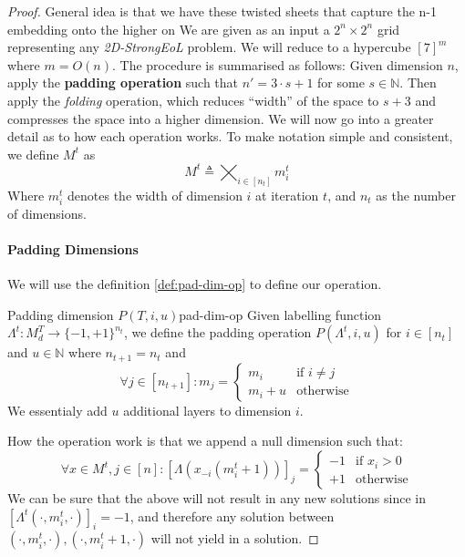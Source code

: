 \begin{proof}

    General idea is that we have these twisted sheets that capture the n-1 embedding onto the higher on
    We are given as an input a $2^n \times 2^n$ grid representing any \textit{2D-StrongEoL} problem. We will reduce to
    a hypercube $[7]^m$ where $m = O(n)$.
    The procedure is summarised as follows:
    Given dimension $n$, apply the \textbf{padding operation} such that $n' = 3 \cdot s + 1$ for some $s \in \mathbb{N}$.
    Then apply the \textit{folding} operation, which reduces ``width'' of the space to
    $s + 3$ and compresses the space into a higher dimension. We will now go into a greater detail as to how each operation works.
    To make notation simple and consistent, we define $M^t$ as
    $$
        M^t \triangleq  \bigtimes_{i \in [n_t]} m_i^t
    $$
    Where $m_i^t$ denotes the width of dimension $i$ at iteration $t$, and $n_t$ as the number of dimensions.

    \paragraph*{Padding Dimensions} We will use the definition \ref{def:pad-dim-op} to define our operation.

    \begin{definitionbox}{Padding dimension $P(T,i,u)$}{pad-dim-op}
        \label{def:pad-dim-op}
        Given labelling function $\Lambda^t: M^T_d \to \{-1,+1\}^{n_t}$, we define
        the padding operation $P(\Lambda^t, i, u)$ for $i \in [n_t]$ and $u \in \mathbb{N}$ where
        $n_{t+1} = n_t$ and
        $$
            \forall j \in [n_{t+1}]: m_j = \begin{cases}
                m_i     & \text{if }  i \neq j \\
                m_i + u & \text{otherwise}
            \end{cases}
        $$
        We essentialy add $u$ additional layers to dimension $i$.
    \end{definitionbox}
    How the operation work is that we append a null dimension such that:
    $$
        \forall x \in M^t, j \in [n] : [\Lambda(x_{-i}(m_i^t + 1))]_j  = \begin{cases}
            -1 & \text{if } x_i > 0 \\
            +1 & \text{otherwise}
        \end{cases}
    $$
    We can be sure that the above will not result in any new solutions since
    in $[\Lambda^t(\cdot, m^t_i, \cdot)]_i = -1$, and therefore
    any solution between  $(\cdot, m^t_i, \cdot), (\cdot, m^t_i+ 1, \cdot)$  will not yield in a solution.


\end{proof}
